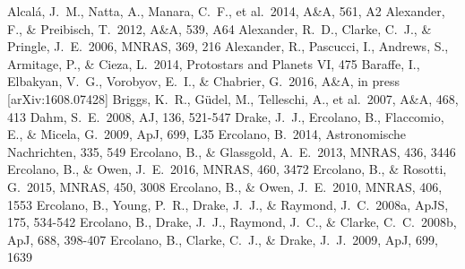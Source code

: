 \documentclass[10pt,fleqn,twoside]{article}
\newcommand*\aap{A\&A}
\newcommand*\aj{AJ}
\newcommand*\apj{ApJ}
\newcommand*\apjl{ApJ}
\newcommand*\apjs{ApJS}
\newcommand*\mnras{MNRAS}
\begin{document}
\begingroup
\renewcommand{\section}[2]{}%
\begin{thebibliography}{}
 Alcal{\'a}, J.~M., Natta, A., Manara, C.~F., et al.\ 2014, \aap, 561, A2 
 Alexander, F., \& Preibisch, T.\ 2012, \aap, 539, A64
 Alexander, R.~D., Clarke, C.~J., \& Pringle, J.~E.\ 2006, \mnras, 369, 216 
 Alexander, R., Pascucci, I., Andrews, S., Armitage, P., \& Cieza, L.\ 2014, Protostars and Planets VI, 475
 Baraffe, I., Elbakyan, V.~G., Vorobyov, E.~I., \& Chabrier, G.\ 2016, \aap, in press [arXiv:1608.07428]
 Briggs, K.~R., G{\"u}del, M., Telleschi, A., et al.\ 2007, \aap, 468, 413 
 Dahm, S.~E.\ 2008, \aj, 136, 521-547 
 Drake, J.~J., Ercolano, B., Flaccomio, E., \& Micela, G.\ 2009, \apjl, 699, L35
 Ercolano, B.\ 2014, Astronomische Nachrichten, 335, 549
 Ercolano, B., \& Glassgold, A.~E.\ 2013, \mnras, 436, 3446 
 Ercolano, B., \& Owen, J.~E.\ 2016, \mnras, 460, 3472 
 Ercolano, B., \& Rosotti, G.\ 2015, \mnras, 450, 3008 
 Ercolano, B., \& Owen, J.~E.\ 2010, \mnras, 406, 1553
 Ercolano, B., Young, P.~R., Drake, J.~J., \& Raymond, J.~C.\ 2008a, \apjs, 175, 534-542 
 Ercolano, B., Drake, J.~J., Raymond, J.~C., \& Clarke, C.~C.\ 2008b, \apj, 688, 398-407 
 Ercolano, B., Clarke, C.~J., \& Drake, J.~J.\ 2009, \apj, 699, 1639

\end{thebibliography}
\end{document}
